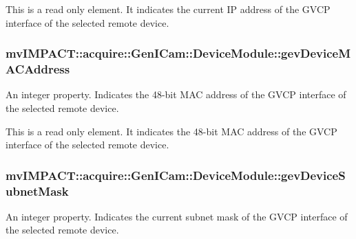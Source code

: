 This is a read only element. It indicates the current I\+P address of the G\+V\+C\+P interface of the selected remote device. \hypertarget{classmv_i_m_p_a_c_t_1_1acquire_1_1_gen_i_cam_1_1_device_module_a6ab8293a3ff60448a8975b50f68e4ebd}{
\subsubsection[{gev\+Device\+M\+A\+C\+Address}]{ mv\+I\+M\+P\+A\+C\+T\+::acquire\+::\+Gen\+I\+Cam\+::\+Device\+Module\+::gev\+Device\+M\+A\+C\+Address}}\label{classmv_i_m_p_a_c_t_1_1acquire_1_1_gen_i_cam_1_1_device_module_a6ab8293a3ff60448a8975b50f68e4ebd}


An integer property. Indicates the 48-\/bit M\+A\+C address of the G\+V\+C\+P interface of the selected remote device. 

This is a read only element. It indicates the 48-\/bit M\+A\+C address of the G\+V\+C\+P interface of the selected remote device. \hypertarget{classmv_i_m_p_a_c_t_1_1acquire_1_1_gen_i_cam_1_1_device_module_a553e881a9dc4dd3c417e150107a9ae2e}{
\subsubsection[{gev\+Device\+Subnet\+Mask}]{ mv\+I\+M\+P\+A\+C\+T\+::acquire\+::\+Gen\+I\+Cam\+::\+Device\+Module\+::gev\+Device\+Subnet\+Mask}}\label{classmv_i_m_p_a_c_t_1_1acquire_1_1_gen_i_cam_1_1_device_module_a553e881a9dc4dd3c417e150107a9ae2e}


An integer property. Indicates the current subnet mask of the G\+V\+C\+P interface of the selected remote device. 

